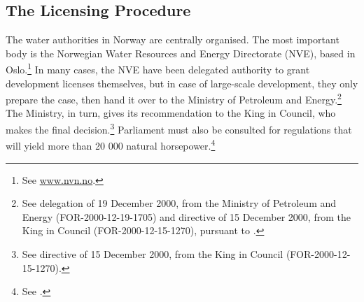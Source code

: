 %
%

\subsection{The Licensing Procedure}\label{sec:step}

The water authorities in Norway are centrally organised. The most important body is the Norwegian Water Resources and Energy Directorate (NVE), based in Oslo.\footnote{See \url{www.nvn.no}.} In many cases, the NVE have been delegated authority to grant development licenses themselves, but in case of large-scale development, they only prepare the case, then hand it over to the Ministry of Petroleum and Energy.\footnote{See delegation of 19 December 2000, from the Ministry of Petroleum and Energy (FOR-2000-12-19-1705) and directive of 15 December 2000, from the King in Council (FOR-2000-12-15-1270), pursuant to \cite[64]{wra00}.} The Ministry, in turn, gives its recommendation to the King in Council, who makes the final decision.\footnote{See directive of 15 December 2000, from the King in Council (FOR-2000-12-15-1270).} Parliament must also be consulted for regulations that will yield more than 20 000 natural horsepower.\footnote{See \cite[2]{wra17}.}


